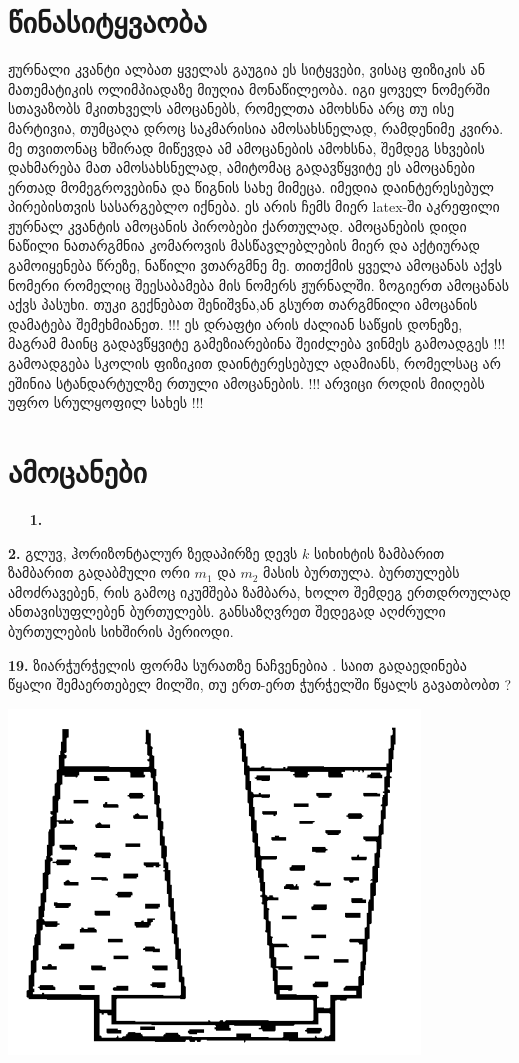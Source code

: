 \documentclass[12pt,a4paper,]{report}
\begin{document}
\tableofcontents

\newpage

\chapter{წინასიტყვაობა}
	ჟურნალი კვანტი ალბათ ყველას გაუგია ეს სიტყვები, ვისაც ფიზიკის ან მათემატიკის ოლიმპიადაზე მიუღია მონაწილეობა. იგი ყოველ ნომერში სთავაზობს მკითხველს ამოცანებს, რომელთა ამოხსნა არც თუ ისე მარტივია, თუმცაღა დროც საკმარისია ამოსახსნელად, რამდენიმე კვირა. მე თვითონაც ხშირად მიწევდა ამ ამოცანების ამოხსნა, შემდეგ სხვების დახმარება მათ ამოსახსნელად, ამიტომაც გადავწყვიტე ეს ამოცანები ერთად მომეგროვებინა და წიგნის სახე მიმეცა. იმედია დაინტერესებულ პირებისთვის სასარგებლო იქნება. ეს არის ჩემს მიერ latex-ში აკრეფილი ჟურნალ კვანტის ამოცანის პირობები ქართულად. ამოცანების დიდი ნაწილი ნათარგმნია კომაროვის მასწავლებლების მიერ და აქტიურად გამოიყენება წრეზე, ნაწილი ვთარგმნე მე. თითქმის ყველა ამოცანას აქვს ნომერი რომელიც შეესაბამება მის ნომერს ჟურნალში. ზოგიერთ ამოცანას აქვს პასუხი. თუკი გექნებათ შენიშვნა,ან გსურთ თარგმნილი ამოცანის დამატება შემეხმიანეთ. !!! ეს დრაფტი არის ძალიან საწყის დონეზე, მაგრამ მაინც გადავწყვიტე გამეზიარებინა შეიძლება ვინმეს გამოადგეს !!! გამოადგება სკოლის ფიზიკით დაინტერესებულ ადამიანს, რომელსაც არ ეშინია სტანდარტულზე რთული ამოცანების. !!! არვიცი როდის მიიღებს უფრო სრულყოფილ სახეს !!!
	
	
\chapter{ამოცანები}

$\ \quad$ \textbf{1.} 

\textbf{2.} გლუვ, ჰორიზონტალურ ზედაპირზე დევს $k$ სიხიხტის ზამბარით ზამბარით გადაბმული ორი $m_1$ და $m_2$ მასის ბურთულა. ბურთულებს ამოძრავებენ, რის გამოც იკუმშება ზამბარა, ხოლო შემდეგ ერთდროულად ანთავისუფლებენ ბურთულებს. განსაზღვრეთ შედეგად აღძრული ბურთულების სიხშირის პერიოდი.
 
\textbf{19.} ზიარჭურჭელის ფორმა სურათზე ნაჩვენებია . საით გადაედინება წყალი შემაერთებელ მილში, თუ ერთ-ერთ ჭურჭელში წყალს გავათბობთ ? 
		\begin{center}
			\includegraphics[scale=0.3]{images/19.png}
		\end{center}
\end{document}
